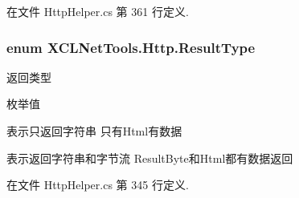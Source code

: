 在文件 Http\-Helper.\-cs 第 361 行定义.

\hypertarget{namespace_x_c_l_net_tools_1_1_http_a3216524397972f7d0c5733b123216e9e}{
\subsubsection[{Result\-Type}]{\setlength{\rightskip}{0pt plus 5cm}enum {\bf X\-C\-L\-Net\-Tools.\-Http.\-Result\-Type}}}\label{namespace_x_c_l_net_tools_1_1_http_a3216524397972f7d0c5733b123216e9e}


返回类型 

\begin{Desc}
\item[枚举值]\par
\begin{description}
\item[{\em 
\hypertarget{namespace_x_c_l_net_tools_1_1_http_a3216524397972f7d0c5733b123216e9ea27118326006d3829667a400ad23d5d98}{String}\label{namespace_x_c_l_net_tools_1_1_http_a3216524397972f7d0c5733b123216e9ea27118326006d3829667a400ad23d5d98}
}]表示只返回字符串 只有\-Html有数据 \item[{\em 
\hypertarget{namespace_x_c_l_net_tools_1_1_http_a3216524397972f7d0c5733b123216e9eaa245c3230debe5c956484ecc6fa93877}{Byte}\label{namespace_x_c_l_net_tools_1_1_http_a3216524397972f7d0c5733b123216e9eaa245c3230debe5c956484ecc6fa93877}
}]表示返回字符串和字节流 Result\-Byte和\-Html都有数据返回 \end{description}
\end{Desc}


在文件 Http\-Helper.\-cs 第 345 行定义.

